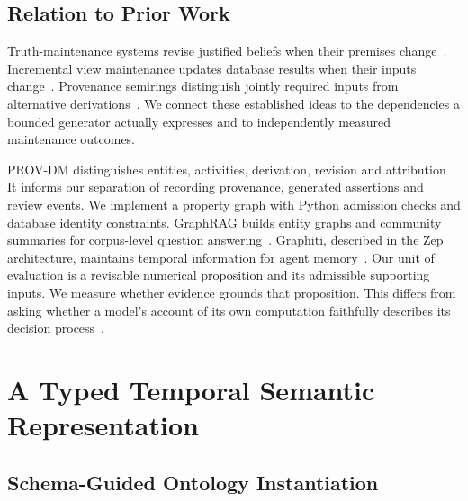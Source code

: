 \documentclass[runningheads]{llncs}
\begin{document}
\subsection{Relation to Prior Work}

Truth-maintenance systems revise justified beliefs when their premises
change~\cite{doyle1979}. Incremental view maintenance updates database results
when their inputs change~\cite{gupta1993}. Provenance semirings distinguish
jointly required inputs from alternative derivations~\cite{green2007}.
We connect these established ideas to the dependencies a bounded generator
actually expresses and to independently measured maintenance outcomes.

PROV-DM distinguishes entities, activities, derivation, revision and
attribution~\cite{prov2013}. It informs our separation of recording provenance,
generated assertions and review events. We implement a property graph with
Python admission checks and database identity constraints. GraphRAG builds entity
graphs and community summaries for corpus-level question answering~\cite{edge2025}.
Graphiti, described in the Zep architecture, maintains temporal information for
agent memory~\cite{rasmussen2025}. Our unit of evaluation is a revisable numerical
proposition and its admissible supporting inputs. We measure whether evidence
grounds that proposition. This differs from asking whether a model's account of
its own computation faithfully describes its decision process~\cite{turpin2023}.






\section{A Typed Temporal Semantic Representation}
\label{sec:representation}

\subsection{Schema-Guided Ontology Instantiation}
\end{document}
